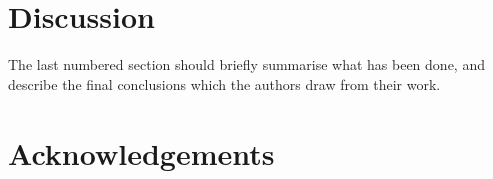 \documentclass[fleqn,usenatbib]{mnras}
\begin{document}
\section{Discussion}

The last numbered section should briefly summarise what has been done, and describe
the final conclusions which the authors draw from their work.

\section*{Acknowledgements}


















\bsp	%
\label{lastpage}
\end{document}
